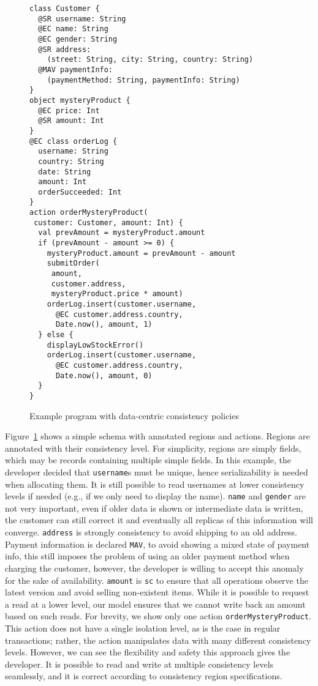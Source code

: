 \documentclass[preprint,numbers]{sigplanconf}
\begin{document}
\begin{figure}[t!] 
\begin{lstlisting}[basicstyle=\small\ttfamily]
class Customer {
  @SR username: String
  @EC name: String
  @EC gender: String
  @SR address: 
    (street: String, city: String, country: String) 
  @MAV paymentInfo:
    (paymentMethod: String, paymentInfo: String)
}
object mysteryProduct {
  @EC price: Int
  @SR amount: Int
}
@EC class orderLog {
  username: String
  country: String
  date: String
  amount: Int
  orderSucceeded: Int
}
action orderMysteryProduct(
 customer: Customer, amount: Int) {
  val prevAmount = mysteryProduct.amount
  if (prevAmount - amount >= 0) {
    mysteryProduct.amount = prevAmount - amount
    submitOrder(
     amount, 
     customer.address, 
     mysteryProduct.price * amount)
    orderLog.insert(customer.username, 
      @EC customer.address.country, 
      Date.now(), amount, 1)
  } else {
    displayLowStockError() 
    orderLog.insert(customer.username, 
      @EC customer.address.country, 
      Date.now(), amount, 0)
  }
}
\end{lstlisting}
\caption{Example program with data-centric consistency policies}
\label{fig:example}
\end{figure}

Figure~\ref{fig:example} shows a simple schema with annotated
regions and actions. Regions are annotated 
with their consistency level. For simplicity, regions are simply fields,
which may be records containing multiple simple fields.
In this example, the developer decided that \texttt{username}s must be 
unique, hence serializability is needed
when allocating them. It is still possible to read usernames at lower
consistency levels if needed (e.g., if we only need to display the name). 
\texttt{name} and \texttt{gender} are not very important, even if older
data is shown or intermediate data is written, the customer can still correct
it and eventually all replicas of this information will converge.
\texttt{address} is strongly consistency to avoid shipping to an old address.
Payment information is declared \texttt{MAV}, to avoid showing a mixed state of payment info, this still
imposes the problem of using an older payment method when charging the customer,
however, the developer is willing to accept this anomaly for the sake of
availability. \texttt{amount} is \texttt{sc} to ensure that all operations
observe the latest version and avoid selling non-existent items. While it is possible to request a read at a lower
level, our model ensures that we cannot write back an amount based on such reads. For brevity,
we show only one action \texttt{orderMysteryProduct}. This action does
not have a single isolation level, as is the case in regular transactions;
rather, the action manipulates data with many different consistency levels.
However, we can see the flexibility and safety this approach gives the
developer. It is possible to read and write at multiple consistency levels
seamlessly, and it is correct according to consistency region specifications.
\end{document}
